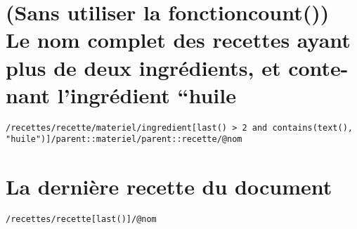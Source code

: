 \section{(Sans utiliser la fonctioncount()) Le nom complet des recettes ayant plus de deux ingrédients, et conte-nant l’ingrédient “huile}
\begin{verbatim}
/recettes/recette/materiel/ingredient[last() > 2 and contains(text(), "huile")]/parent::materiel/parent::recette/@nom
\end{verbatim}

\section{La dernière recette du document}
\begin{verbatim}
/recettes/recette[last()]/@nom
\end{verbatim}

